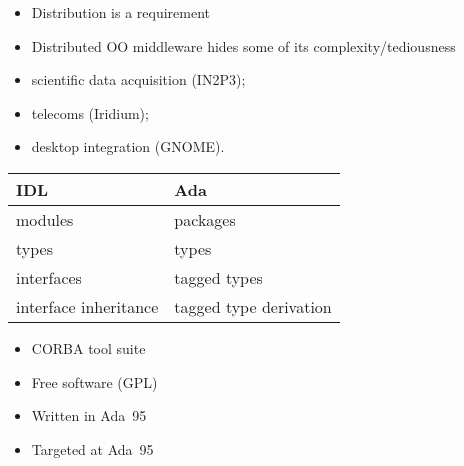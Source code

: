 \documentclass[a4,slidesec]{seminar}
\newcommand{\ab}{AdaBroker}
\newcommand{\ada}{Ada~95}
\begin{document}
\begin{slide}

\begin{itemize}
\item Distribution is a requirement
\item Distributed OO middleware hides some of its complexity/tediousness
\end{itemize}

\begin{itemize}
\item scientific data acquisition (IN2P3);
\item telecoms (Iridium);
\item desktop integration (GNOME).
\end{itemize}
\end{slide}

\begin{slide}


\centering
\begin{tabular}{l|l}
\textbf{IDL} & \textbf{Ada} \\ \hline
modules & packages \\
types & types \\
interfaces & tagged types \\
interface inheritance & tagged type derivation
\end{tabular}

\end{slide}

\begin{slide}
\slideheading{\ab}

\begin{itemize}
\item CORBA tool suite
\item Free software (GPL)
\item Written in \ada{}
\item Targeted at \ada{}
\end{itemize}
\end{slide}
\end{document}
